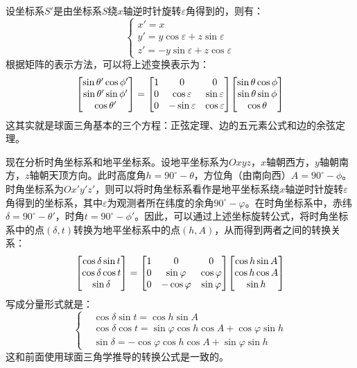 \documentclass[a4paper]{article}
\renewcommand\epsilon{\varepsilon}
\begin{document}
设坐标系$S'$是由坐标系$S$绕$x$轴逆时针旋转$\epsilon$角得到的，则有：
\[
    \begin{cases}
        x' = x \\
        y' = y\cos\epsilon + z\sin\epsilon \\
        z' = -y\sin\epsilon + z\cos\epsilon
    \end{cases}
\]
根据矩阵的表示方法，可以将上述变换表示为：
\[
    \mqty[\sin{\theta'} \cos{\phi'} \\ \sin{\theta'} \sin{\phi'} \\ \cos{\theta'}] =
    \mqty[1 & 0 & 0 \\ 0 & \cos\epsilon & \sin\epsilon \\ 0 & -\sin\epsilon & \cos\epsilon]
    \mqty[\sin{\theta} \cos{\phi} \\ \sin{\theta} \sin{\phi} \\ \cos{\theta}]
\]
这其实就是球面三角基本的三个方程：正弦定理、边的五元素公式和边的余弦定理。

现在分析时角坐标系和地平坐标系。设地平坐标系为$Oxyz$，$x$轴朝西方，$y$轴朝南方，$z$轴朝天顶方向。此时高度角$h = 90^\circ - \theta$，方位角（由南向西）$A = 90^\circ - \phi$。时角坐标系为$Ox'y'z'$，则可以将时角坐标系看作是地平坐标系绕$x$轴逆时针旋转$\epsilon$角得到的坐标系，其中$\epsilon$为观测者所在纬度的余角$90^\circ - \varphi$。在时角坐标系中，赤纬$\delta = 90^\circ - \theta'$，时角$t = 90^\circ - \phi'$。因此，可以通过上述坐标旋转公式，将时角坐标系中的点$(\delta, t)$转换为地平坐标系中的点$(h, A)$，从而得到两者之间的转换关系：
\[
    \mqty[\cos{\delta} \sin{t} \\ \cos{\delta} \cos{t} \\ \sin{\delta}] =
    \mqty[1 & 0 & 0 \\ 0 & \sin{\varphi} & \cos{\varphi} \\ 0 & -\cos{\varphi} & \sin{\varphi}]
    \mqty[\cos{h} \sin{A} \\ \cos{h} \cos{A} \\ \sin{h}]
\]
写成分量形式就是：
\[
    \begin{cases}
        & \cos{\delta}\sin{t} = \cos{h}\sin{A} \\
        & \cos{\delta}\cos{t} = \sin{\varphi}\cos{h}\cos{A} + \cos{\varphi}\sin{h} \\
        & \sin{\delta} = -\cos{\varphi}\cos{h}\cos{A} + \sin{\varphi}\sin{h}
    \end{cases}
\]
这和前面使用球面三角学推导的转换公式是一致的。
\end{document}
